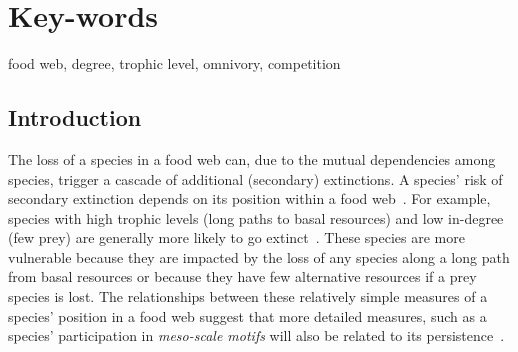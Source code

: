 \documentclass[12pt]{article}
\begin{document}
\section*{Key-words}
    food web, degree, trophic level, omnivory, competition

\clearpage
\begin{spacing}{2.0}

\section*{Introduction} %

    The loss of a species in a food web can, due to the mutual dependencies among species,  trigger a cascade of additional (secondary) extinctions. 
    A species' risk of secondary extinction depends on its position within a food web~\citep{Santos2021,curtsdotter2011robustness, dunne2009cascading, Eklof2006}.
    For example, species with high trophic levels (long paths to basal resources) and low in-degree (few prey) are generally more likely to go extinct~\citep{Allesina2012,binzer2011susceptibility, Eklof2006}.
    These species are more vulnerable because they are impacted by the loss of any species along a long path from basal resources or because they have few alternative resources if a prey species is lost.
    The relationships between these relatively simple measures of a species' position in a food web suggest that more detailed measures, such as a species' participation in \emph{meso-scale motifs} will also be related to its persistence~\citep{Cirtwill2015a,Cirtwill2018FoodWebs,Cirtwill2022Oikos}.
    

\end{spacing}
\end{document}
